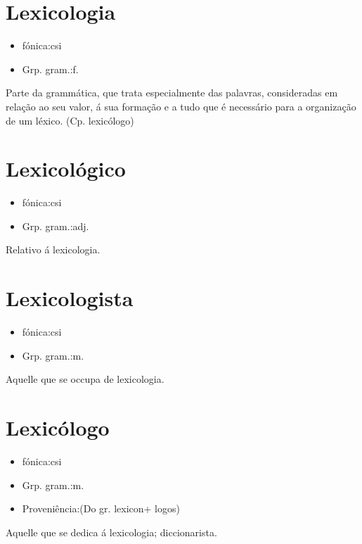 \section{Lexicologia}
\begin{itemize}
\item {fónica:csi}
\end{itemize}
\begin{itemize}
\item {Grp. gram.:f.}
\end{itemize}
Parte da grammática, que trata especialmente das palavras, consideradas em relação ao seu valor, á sua formação e a tudo que é necessário para a organização de um léxico.
(Cp. \textunderscore lexicólogo\textunderscore )
\section{Lexicológico}
\begin{itemize}
\item {fónica:csi}
\end{itemize}
\begin{itemize}
\item {Grp. gram.:adj.}
\end{itemize}
Relativo á lexicologia.
\section{Lexicologista}
\begin{itemize}
\item {fónica:csi}
\end{itemize}
\begin{itemize}
\item {Grp. gram.:m.}
\end{itemize}
Aquelle que se occupa de lexicologia.
\section{Lexicólogo}
\begin{itemize}
\item {fónica:csi}
\end{itemize}
\begin{itemize}
\item {Grp. gram.:m.}
\end{itemize}
\begin{itemize}
\item {Proveniência:(Do gr. \textunderscore lexicon\textunderscore  + \textunderscore logos\textunderscore )}
\end{itemize}
Aquelle que se dedica á lexicologia; diccionarista.

